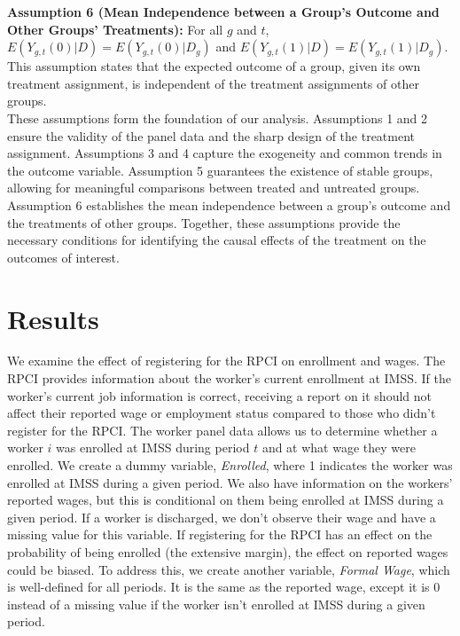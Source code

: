 \documentclass[10pt, oneside]{book}
\begin{document}
\textbf{Assumption 6 (Mean Independence between a Group's Outcome and Other Groups' Treatments):} For all $g$ and $t$, $E(Y_{g,t}(0)|D) = E(Y_{g,t}(0)|D_g)$ and $E(Y_{g,t}(1)|D) = E(Y_{g,t}(1)|D_g)$. This assumption states that the expected outcome of a group, given its own treatment assignment, is independent of the treatment assignments of other groups. \\

These assumptions form the foundation of our analysis. Assumptions 1 and 2 ensure the validity of the panel data and the sharp design of the treatment assignment. Assumptions 3 and 4 capture the exogeneity and common trends in the outcome variable. Assumption 5 guarantees the existence of stable groups, allowing for meaningful comparisons between treated and untreated groups. Assumption 6 establishes the mean independence between a group's outcome and the treatments of other groups. Together, these assumptions provide the necessary conditions for identifying the causal effects of the treatment on the outcomes of interest. \\

\chapter{Results} \label{results}

We examine the effect of registering for the RPCI on enrollment and wages. The RPCI provides information about the worker's current enrollment at IMSS. If the worker's current job information is correct, receiving a report on it should not affect their reported wage or employment status compared to those who didn't register for the RPCI. The worker panel data allows us to determine whether a worker $i$ was enrolled at IMSS during period $t$ and at what wage they were enrolled. We create a dummy variable, \textit{Enrolled}, where 1 indicates the worker was enrolled at IMSS during a given period. We also have information on the workers' reported wages, but this is conditional on them being enrolled at IMSS during a given period. If a worker is discharged, we don't observe their wage and have a missing value for this variable. If registering for the RPCI has an effect on the probability of being enrolled (the extensive margin), the effect on reported wages could be biased. To address this, we create another variable, \textit{Formal Wage}, which is well-defined for all periods. It is the same as the reported wage, except it is 0 instead of a missing value if the worker isn't enrolled at IMSS during a given period. \\
\end{document}
